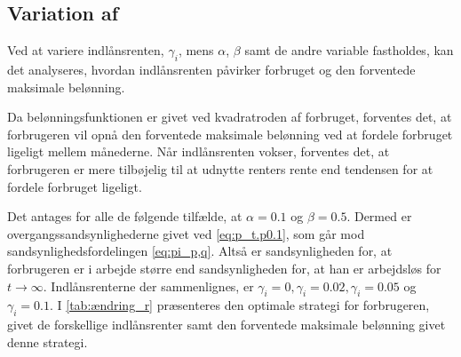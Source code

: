 


\subsection[Variation af  \texorpdfstring{$\gamma_i$}{indlånsrenten}]{Variation af }

Ved at variere indlånsrenten, $\gamma_i$, mens $\alpha$, $\beta$ samt de andre variable fastholdes, kan det analyseres, hvordan indlånsrenten påvirker forbruget og den forventede maksimale belønning.

Da belønningsfunktionen er givet ved kvadratroden af forbruget, forventes det, at forbrugeren vil opnå den forventede maksimale belønning ved at fordele forbruget ligeligt mellem månederne. Når indlånsrenten vokser, forventes det, at forbrugeren er mere tilbøjelig til at udnytte renters rente end tendensen for at fordele forbruget ligeligt. 

Det antages for alle de følgende tilfælde, at $\alpha=0.1$ og $\beta=0.5$. Dermed er overgangssandsynlighederne givet ved \eqref{eq:p_t.p0.1}, som går mod sandsynlighedsfordelingen \eqref{eq:pi_p,q}. Altså er sandsynligheden for, at forbrugeren er i arbejde større end sandsynligheden for, at han er arbejdsløs for $t\to\infty $. Indlånsrenterne der sammenlignes, er $\gamma_i = 0, \gamma_i=0.02, \gamma_i = 0.05$ og $\gamma_i = 0.1$. I \autoref{tab:ændring_r} præsenteres den optimale strategi for forbrugeren, givet de forskellige indlånsrenter samt den forventede maksimale belønning givet denne strategi. 



